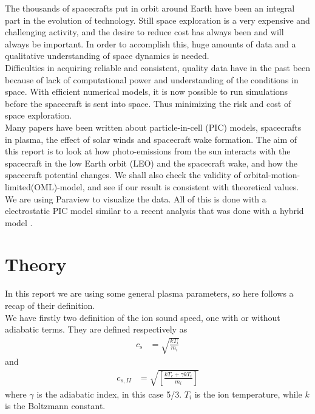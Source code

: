 \documentclass[aip, 
rsi, 
amsmath,
amssymb,
longbibliography,
reprint]{revtex4-1}
\begin{document}
The thousands of spacecrafts put in orbit around Earth have been an integral part in the evolution of technology. Still space exploration is a very expensive and challenging activity, and the desire to reduce cost has always been and will always be important. In order to accomplish this, huge amounts of data and a qualitative understanding of space dynamics is needed. \\

Difficulties in acquiring reliable and consistent, quality data have in the past been because of lack of computational power and understanding of the conditions in space. With efficient numerical models, it is now possible to run simulations before the spacecraft is sent into space. Thus minimizing the risk and cost of space exploration. \\

Many papers have been written about particle-in-cell (PIC) models, spacecrafts in plasma, the effect of solar winds and spacecraft wake formation. The aim of this report is to look at how photo-emissions from the sun interacts with the spacecraft in the low Earth orbit (LEO) and the spacecraft wake, and how the spacecraft potential changes. We shall also check the validity of orbital-motion-limited(OML)-model, and see if our result is consistent with theoretical values. We are using Paraview to visualize the data. All of this is done with a electrostatic PIC model similar to a recent analysis that was done with a hybrid model \cite{P7}.

\section{\label{sec:theory} Theory}

In this report we are using some general plasma parameters, so here follows a recap of their definition.\\

We have firstly two definition of the ion sound speed, one with or without adiabatic terms. They are defined respectively as 
\begin{align}
c_s &= \sqrt{\frac{k T_i}{m_i}}\label{eq:IonSpeed}
\end{align}
and
\begin{align}
c_{s,II} &= \sqrt{\left[ \frac{kT_e + \gamma k T_i}{m_i}\right]}\label{eq:IonSpeed2}
\end{align}
where $\gamma$ is the adiabatic index, in this case 5/3. $T_i$ is the ion temperature, while $k$ is the Boltzmann constant.\\
\end{document}
